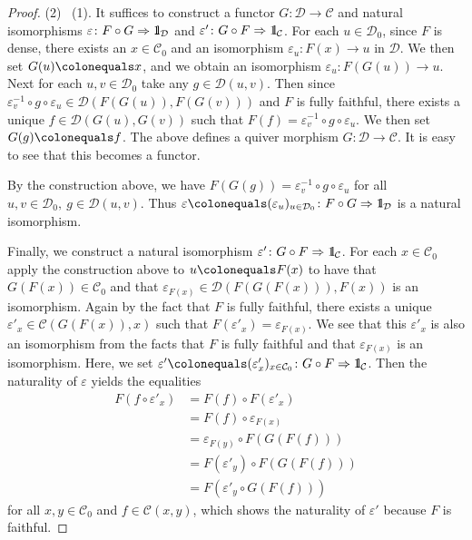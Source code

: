 \documentclass{surv-l}
\numberwithin{equation}{chapter}
\numberwithin{figure}{chapter}
\theoremstyle{plain}
\theoremstyle{definition}
\theoremstyle{remark}
\newcommand{\id}{1\kern-.25em{\text{{\rm l}}}}
\begin{document}
\begin{proof}
(2) \text{$\Rightarrow$}\  (1).
It suffices to construct a functor $G \colon {\mathcal{D}} \to {\mathcal{C}}$ and
natural isomorphisms $\varepsilon \colon F \circ G \Rightarrow \id_{\mathcal{D}}$ and
$\varepsilon' \colon G \circ F \Rightarrow \id_{\mathcal{C}}$.
For each $u \in {\mathcal{D}}_0$, since $F$ is dense, there exists an $x \in {\mathcal{C}}_0$
and an isomorphism $\varepsilon_{u} \colon F(x) \to u$ in ${\mathcal{D}}$.
We then set $G(u)\colonequals  x$, and we obtain an isomorphism $\varepsilon_{u} \colon F(G(u)) \to u$.
Next for each $u, v \in {\mathcal{D}}_0$ take any $g \in {\mathcal{D}}(u, v)$.
Then since $\varepsilon_{v}^{-1} \circ g \circ \varepsilon_{u} \in {\mathcal{D}}(F(G(u)), F(G(v)))$
and $F$ is fully faithful, there exists a unique $f \in {\mathcal{D}}(G(u), G(v))$ such that
$F(f) = \varepsilon_{v}^{-1} \circ g \circ \varepsilon_{u}$.
We then set $G(g)\colonequals  f$.
The above defines a quiver morphism $G \colon {\mathcal{D}} \to {\mathcal{C}}$.
It is easy to see that this becomes a functor.

By the construction above,
we have $F(G(g)) = \varepsilon_{v}^{-1} \circ g \circ \varepsilon_{u}$ for all
$u, v \in {\mathcal{D}}_0,\ g \in {\mathcal{D}}(u, v)$.
Thus $\varepsilon\colonequals  (\varepsilon_{u})_{u \in {\mathcal{D}}_0} \colon F\circ G \Rightarrow \id_{{\mathcal{D}}}$ is a natural isomorphism.

Finally, we construct a natural isomorphism $\varepsilon' \colon G \circ F \Rightarrow \id_{\mathcal{C}}$.
For each $x \in {\mathcal{C}}_0$ apply the construction above to $u\colonequals  F(x)$ to have
that $G(F(x)) \in {\mathcal{C}}_0$ and that $\varepsilon_{F(x)} \in {\mathcal{D}}(F(G(F(x))), F(x))$ is an isomorphism.
Again by the fact that $F$ is fully faithful, there exists a unique $\varepsilon'_x \in {\mathcal{C}}(G(F(x)), x)$
such that $F(\varepsilon'_x) = \varepsilon_{F(x)}$.
We see that this $\varepsilon'_x$ is also an isomorphism from the facts that
$F$ is fully faithful and that $\varepsilon_{F(x)}$ is an isomorphism.
Here, we set
$\varepsilon'\colonequals  (\varepsilon'_x)_{x\in {\mathcal{C}}_0} \colon G\circ F \Rightarrow \id_{\mathcal{C}}$.
Then the naturality of $\varepsilon$ yields the equalities
\[
\begin{aligned}
F(f \circ \varepsilon'_x) &= F(f) \circ F(\varepsilon'_x)\\
& = F(f) \circ \varepsilon_{F(x)} \\
&= \varepsilon_{F(y)} \circ F(G(F(f)))\\
&= F(\varepsilon'_y) \circ F(G(F(f))) \\
&= F(\varepsilon'_y \circ G(F(f)))
\end{aligned}
\]
for all $x, y \in {\mathcal{C}}_0$ and $f \in {\mathcal{C}}(x, y)$, which shows the naturality of
$\varepsilon'$ because $F$ is faithful.
\end{proof}
\end{document}
